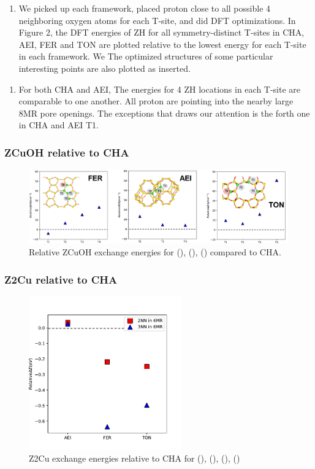 \documentclass[12pt]{article}
\begin{document}
\begin{enumerate}
\item We picked up each framework, placed proton close to all possible 4 neighboring oxygen atoms for each T-site, and did DFT optimizations. In Figure 2, the DFT energies of ZH for all symmetry-distinct T-sites in CHA, AEI, FER and TON are plotted relative to the lowest energy for each T-site in each framework. We The optimized structures of some particular interesting points are also plotted as inserted.
\end{enumerate}

\begin{enumerate}[resume]
\item For both CHA and AEI, The energies for 4 ZH locations in each T-site are comparable to one another. All proton are pointing into the nearby large 8MR pore openings. The exceptions that draws our attention is the forth one in CHA and AEI T1. 
\end{enumerate}

\subsubsection*{ZCuOH relative to CHA}
\begin{figure}[H]
\centering
  \includegraphics[width=5.2in]{./Figures/Figure-3}
  \caption{Relative ZCuOH exchange energies  for (), (), () compared to CHA.}
  \label{ZH}
\end{figure}

\subsubsection*{Z2Cu relative to CHA}
\begin{figure}[H]
\centering
  \includegraphics[width=2.6in]{./Figures/Figure-4}
  \caption{Z2Cu exchange energies relative to CHA for (), (), (), ()}
  \label{PhaseDiagram}
\end{figure}
\end{document}
